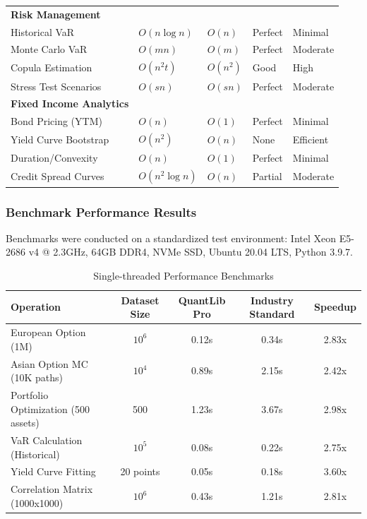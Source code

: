 \documentclass[12pt,a4paper]{article}
\theoremstyle{definition}
\theoremstyle{remark}
\begin{document}
\begin{longtable}{p{4cm}p{2cm}p{2cm}p{2cm}p{2cm}}
\textbf{Risk Management} & & & & \\
Historical VaR & $O(n \log n)$ & $O(n)$ & Perfect & Minimal \\
Monte Carlo VaR & $O(mn)$ & $O(m)$ & Perfect & Moderate \\
Copula Estimation & $O(n^2 t)$ & $O(n^2)$ & Good & High \\
Stress Test Scenarios & $O(sn)$ & $O(sn)$ & Perfect & Moderate \\
\midrule
\textbf{Fixed Income Analytics} & & & & \\
Bond Pricing (YTM) & $O(n)$ & $O(1)$ & Perfect & Minimal \\
Yield Curve Bootstrap & $O(n^2)$ & $O(n)$ & None & Efficient \\
Duration/Convexity & $O(n)$ & $O(1)$ & Perfect & Minimal \\
Credit Spread Curves & $O(n^2 \log n)$ & $O(n)$ & Partial & Moderate \\
\end{longtable}

\subsubsection{Benchmark Performance Results}

Benchmarks were conducted on a standardized test environment: Intel Xeon E5-2686 v4 @ 2.3GHz, 64GB DDR4, NVMe SSD, Ubuntu 20.04 LTS, Python 3.9.7.

\begin{table}[H]
\centering
\caption{Single-threaded Performance Benchmarks}
\begin{tabular}{@{}lcccc@{}}
\toprule
Operation & Dataset Size & QuantLib Pro & Industry Standard & Speedup \\
\midrule
European Option (1M) & $10^6$ & 0.12s & 0.34s & 2.83x \\
Asian Option MC (10K paths) & $10^4$ & 0.89s & 2.15s & 2.42x \\
Portfolio Optimization (500 assets) & 500 & 1.23s & 3.67s & 2.98x \\
VaR Calculation (Historical) & $10^5$ & 0.08s & 0.22s & 2.75x \\
Yield Curve Fitting & 20 points & 0.05s & 0.18s & 3.60x \\
Correlation Matrix (1000x1000) & $10^6$ & 0.43s & 1.21s & 2.81x \\
\bottomrule
\end{tabular}
\end{table}
\end{document}
